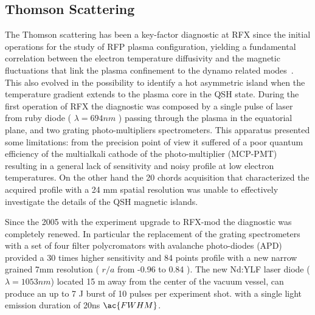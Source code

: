 \subsection{Thomson Scattering}
The Thomson scattering  has been a key-factor diagnostic at RFX since the initial operations for the study of RFP plasma configuration, yielding a fundamental correlation between the electron temperature diffusivity and the magnetic fluctuations that link the plasma confinement to the dynamo related modes~\cite{}. This also evolved in the possibility to identify a hot asymmetric island when the temperature gradient extends to the plasma core in the \ac{QSH} state.
During the first operation of RFX the diagnostic was composed by a single pulse of laser from ruby diode ( $\lambda = 694 nm$ ) passing through the plasma in the equatorial plane, and two grating photo-multipliers spectrometers.
This apparatus presented some limitations: from the precision point of view it suffered of a poor quantum efficiency of the multialkali cathode of the photo-multiplier (MCP-PMT) resulting in a general lack of sensitivity and noisy profile at low electron temperatures. On the other hand the 20 chords acquisition that characterized the acquired profile with a 24 mm spatial resolution was unable to effectively investigate the details of the QSH magnetic islands.

Since the 2005 with the experiment upgrade to RFX-mod the diagnostic was completely renewed. In particular the replacement of the grating spectrometers with a set of four filter polycromators with avalanche photo-diodes (APD) provided a 30 times higher sensitivity and 84 points profile with a new narrow grained 7mm resolution ( $r/a$ from -0.96 to 0.84 ).
The new Nd:YLF laser diode ($\lambda=1053 nm$) located 15 m away from the center of the vacuum vessel, can produce an up to 7 J burst of 10 pulses per experiment shot. with a single light emission duration of 20ns $\ac{FWHM}$.

